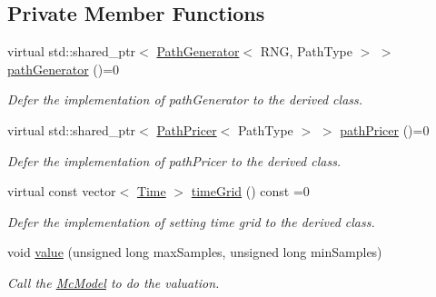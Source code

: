 \subsection*{Private Member Functions}
\begin{DoxyCompactItemize}
\item 
virtual std\+::shared\+\_\+ptr$<$ \hyperlink{class_path_generator}{Path\+Generator}$<$ R\+NG, Path\+Type $>$ $>$ \hyperlink{class_mc_simulation_ad2338ca624a9bbfaec8e4d882471d546}{path\+Generator} ()=0
\begin{DoxyCompactList}\small\item\em Defer the implementation of path\+Generator to the derived class. \end{DoxyCompactList}\item 
virtual std\+::shared\+\_\+ptr$<$ \hyperlink{class_path_pricer}{Path\+Pricer}$<$ Path\+Type $>$ $>$ \hyperlink{class_mc_simulation_a4d755ea777c2f3a2ec2fcc70acf71a6d}{path\+Pricer} ()=0
\begin{DoxyCompactList}\small\item\em Defer the implementation of path\+Pricer to the derived class. \end{DoxyCompactList}\item 
virtual const vector$<$ \hyperlink{_name_def_8h_ac2d3e0ba793497bcca555c7c2cf64ff3}{Time} $>$ \hyperlink{class_mc_simulation_acf7d24981be3025a2cf07f8623dbe8ce}{time\+Grid} () const =0
\begin{DoxyCompactList}\small\item\em Defer the implementation of setting time grid to the derived class. \end{DoxyCompactList}\item 
void \hyperlink{class_mc_simulation_ae2f03b55464c189295aab9b8fd7b0a37}{value} (unsigned long max\+Samples, unsigned long min\+Samples)
\begin{DoxyCompactList}\small\item\em Call the \hyperlink{class_mc_model}{Mc\+Model} to do the valuation. \end{DoxyCompactList}\end{DoxyCompactItemize}
